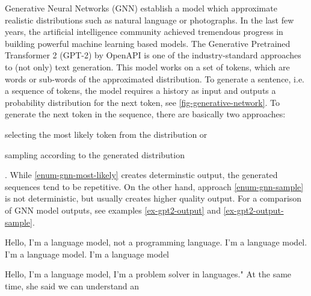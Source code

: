 \documentclass[english,version-2020-11]{uzl-thesis}
\begin{document}
Generative Neural Networks (GNN) establish a model which approximate realistic distributions such as natural language or photographs.
In the last few years, the artificial intelligence community achieved tremendous progress in building powerful machine learning based models.
The Generative Pretrained Transformer 2 (GPT-2) by OpenAPI is one of the industry-standard approaches to (not only) text generation.
This model works on a set of tokens, which are words or sub-words of the approximated distribution.
To generate a sentence, i.e. a sequence of tokens, the model requires a history as input and outputs a probability distribution for the next token, see \ref{fig-generative-network}.
To generate the next token in the sequence, there are basically two approaches:
\begin{enumerate*}[label=(\roman*)] \item \label{enum-gnn-most-likely} selecting the most likely token from the distribution or \item \label{enum-gnn-sample} sampling according to the generated distribution \end{enumerate*}.
While \ref{enum-gnn-most-likely} creates determinstic output, the generated sequences tend to be repetitive.
On the other hand, approach \ref{enum-gnn-sample} is not deterministic, but usually creates higher quality output.
For a comparison of GNN model outputs, see examples \ref{ex-gpt2-output} and \ref{ex-gpt2-output-sample}.


\begin{example}
	Hello, I'm a language model, not a programming language. I'm a language model. I'm a language model. I'm a language model
	\label{ex-gpt2-output}
\end{example}


\begin{example}
	Hello, I'm a language model, I'm a problem solver in languages."
	At the same time, she said we can understand an
	\label{ex-gpt2-output-sample}
\end{example}
\end{document}
